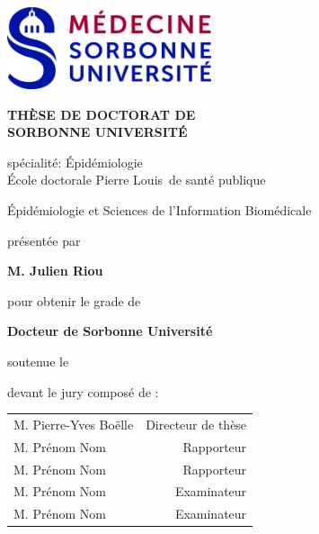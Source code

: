 \documentclass[a4paper,12pt]{book}
\numberwithin{equation}{chapter}
\numberwithin{figure}{chapter}
\numberwithin{table}{chapter}
\begin{document}
\frontmatter %
\thispagestyle{empty}

\begin{center}

\includegraphics[width=6cm]{Figures/LOGO_MEDECINE.jpg}
\vspace*{1.5cm}

{\large{\bf  TH\`ESE DE DOCTORAT DE \\[.5em] SORBONNE UNIVERSITÉ }}

\vspace*{1cm}
{\large spécialité:  Épidémiologie} \\ 


\vspace*{1cm}
{\large École doctorale \guillemotleft Pierre Louis\guillemotright \, de santé publique}

\vspace*{.2cm}
Épidémiologie et Sciences de l'Information Biomédicale

\vspace*{1cm}
{\large présentée par}

\vspace*{0.2cm}
{\large {\bf M. Julien Riou}}

\vspace*{1cm}
{\large pour obtenir le grade de}

\vspace*{0.2cm}
{\large{\bf Docteur de Sorbonne Université}} \\

\vspace*{1.5cm}
\doublespacing
{}
\singlespacing

\end{center}

\vspace*{1.5cm} 
{\large soutenue le }

\vspace*{1cm} 
{\large devant le jury composé de : }

\begin{center}
{\large 
\begin{tabular}{p{10cm} r}
  M. Pierre-Yves Boëlle & Directeur de thèse\\
  M. Prénom Nom & Rapporteur \\
  M. Prénom Nom & Rapporteur  \\
  M. Prénom Nom & Examinateur  \\
  M. Prénom Nom & Examinateur  \\
\end{tabular}
}
\end{center}
\end{document}
